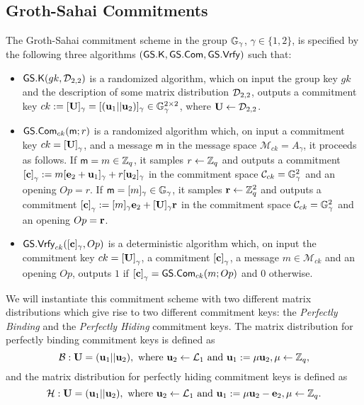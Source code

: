 \subsection{Groth-Sahai Commitments} 
 
\begin{definition} The Groth-Sahai commitment scheme in the group $\mathbb{G}_\gamma$, $\gamma\in\{1,2\}$, is  specified by the following three algorithms 
	$(\mathsf{GS}.\mathsf{K},\mathsf{GS}.\mathsf{Com},\mathsf{GS}.\mathsf{Vrfy})$ such that:
	\begin{itemize} 
		\item  $\mathsf{GS}.\mathsf{K}(gk,\mathcal{D}_{2,2})$ is a randomized algorithm, which on input the group key $gk$ and the description of some matrix distribution $\mathcal{D}_{2,2}$, outputs a commitment key $ck:=[\mathbf{{U}}]_\gamma=[(\mathbf{u}_1||\mathbf{u}_2)]_\gamma \in\mathbb{G}_\gamma^{2\times 2}$, where $\mathbf{{U}}\gets\mathcal{D}_{2,2}$.
		\item $\mathsf{GS}.\mathsf{Com}_{ck}(\mathsf{m};r)$ is a randomized algorithm which, on input a commitment key $ck=\left[\mathbf{{U}}\right]_\gamma$, and a message 
		$\mathsf{m}$ in the message space $\mathcal{M}_{ck}=A_\gamma$, it proceeds as follows. If $\mathsf{m}=m\in\mathbb{Z}_q$, it samples $r \gets \mathbb{Z}_q$ and outputs a commitment $\left[\mathbf{c}\right]_\gamma := m[\mathbf{e}_2+\mathbf{u}_1]_\gamma+r[\mathbf{u}_2]_\gamma$ in the commitment space $\mathcal{C}_{ck}=\mathbb{G}_\gamma^2$ and an opening $Op=r$. If $\mathsf{m}=[m]_\gamma\in\mathbb{G}_\gamma$, it samples $\mathbf{r} \gets \mathbb{Z}_q^2$ and outputs a commitment $\left[\mathbf{c}\right]_\gamma := [m]_\gamma\mathbf{e}_2+[\mathbf{{U}}]_\gamma\mathbf{r}$ in the commitment space $\mathcal{C}_{ck}=\mathbb{G}_\gamma^2$ and an opening $Op=\mathbf{r}$.
		\item $\mathsf{GS}.\mathsf{Vrfy}_{ck}([\mathbf{c}]_\gamma,Op)$ is a deterministic algorithm which, on input the commitment key $ck=\left[\mathbf{{U}}\right]_\gamma$, a commitment $\left[\mathbf{c}\right]_\gamma$,  a message 
		$m \in \mathcal{M}_{ck}$ and an opening $Op$, outputs $1$ if $\left[\mathbf{c}\right]_\gamma={\mathsf{GS}}.\mathsf{Com}_{ck}(m;Op)$
		and $0$ otherwise.
	\end{itemize}
\end{definition}

We will instantiate this commitment scheme with two different matrix distributions which give rise to two different commitment keys: the \emph{Perfectly Binding} and the \emph{Perfectly Hiding} commitment keys. The matrix distribution for perfectly binding commitment keys is defined as
$$
\mathcal{B}:\mathbf{{U}}=(\mathbf{u}_1||\mathbf{u}_2),\text{ where }\mathbf{u}_2\gets\mathcal{L}_1\text{ and } \mathbf{u}_1 :=\mu\mathbf{u}_2, \mu\gets\mathbb{Z}_q,
$$
and the matrix distribution for perfectly hiding commitment keys is defined as
$$
\mathcal{H}:\mathbf{{U}}=(\mathbf{u}_1||\mathbf{u}_2),\text{ where } \mathbf{u}_2\gets\mathcal{L}_1\text{ and } \mathbf{u}_1 :=\mu\mathbf{u}_2-\mathbf{e}_2, \mu\gets\mathbb{Z}_q.
$$

